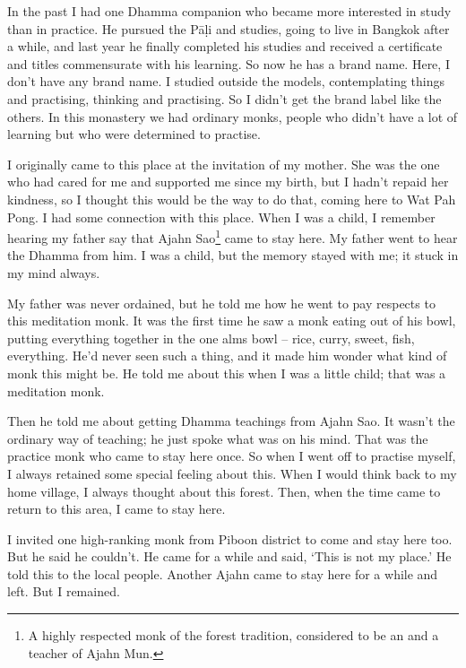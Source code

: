 In the past I had one Dhamma companion who became more interested in study than in practice. He pursued the P\=a\d{l}i and  studies, going to live in Bangkok after a while, and last year he finally completed his studies and received a certificate and titles commensurate with his learning. So now he has a brand name. Here, I don't have any brand name. I studied outside the models, contemplating things and practising, thinking and practising. So I didn't get the brand label like the others. In this monastery we had ordinary monks, people who didn't have a lot of learning but who were determined to practise. 

I originally came to this place at the invitation of my mother. She was the one who had cared for me and supported me since my birth, but I hadn't repaid her kindness, so I thought this would be the way to do that, coming here to Wat Pah Pong. I had some connection with this place. When I was a child, I remember hearing my father say that Ajahn Sao\footnote{A highly respected monk of the forest tradition, considered to be an  and a teacher of Ajahn Mun.} came to stay here. My father went to hear the Dhamma from him. I was a child, but the memory stayed with me; it stuck in my mind always. 

My father was never ordained, but he told me how he went to pay respects to this meditation monk. It was the first time he saw a monk eating out of his bowl, putting everything together in the one alms bowl -- rice, curry, sweet, fish, everything. He'd never seen such a thing, and it made him wonder what kind of monk this might be. He told me about this when I was a little child; that was a meditation monk. 

Then he told me about getting Dhamma teachings from Ajahn Sao. It wasn't the ordinary way of teaching; he just spoke what was on his mind. That was the practice monk who came to stay here once. So when I went off to practise myself, I always retained some special feeling about this. When I would think back to my home village, I always thought about this forest. Then, when the time came to return to this area, I came to stay here. 

I invited one high-ranking monk from Piboon district to come and stay here too. But he said he couldn't. He came for a while and said, `This is not my place.' He told this to the local people. Another Ajahn came to stay here for a while and left. But I remained. 

